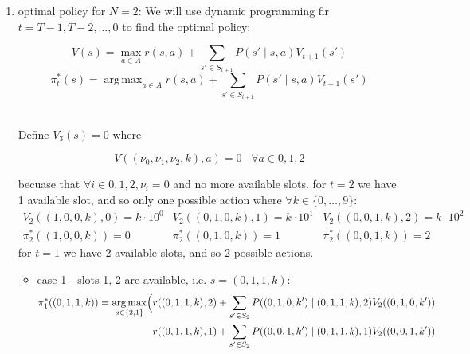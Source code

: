 \documentclass{assignmeownt}
\DeclareMathOperator*{\argmax}{arg\,max}
\begin{document}
\begin{enumerate}
\item optimal policy for $N=2$:
\newline
We will use dynamic programming fir $t=T-1, T-2, \dots, 0$ to find the optimal policy:
\begin{fleqn}
    \begin{equation}
        V(s) = \max_{a \in A}  r(s, a) + \sum_{s' \in S_{t+1}} P(s' \mid s, a) V_{t+1}(s')
    \end{equation}
    \begin{equation}
        \pi^*_t(s) = \argmax_{a \in A}  r(s, a) + \sum_{s' \in S_{t+1}} P(s' \mid s, a) V_{t+1}(s')
    \end{equation}
\end{fleqn}
\\ 
Define $V_3(s) = 0$ where 
\newline
\begin{fleqn}
    \begin{equation}
        V((\nu_0, \nu_1, \nu_2, k), a) = 0 \;\;\; \forall a \in {0, 1, 2}
    \end{equation}
\end{fleqn}
becuase that $\forall i \in {0, 1, 2}, \nu_i = 0$ and no more available slots.
\newline
for $t=2$ we have 1 available slot, and so only one possible action where $\forall k \in \{0, \dots, 9\}$:
\begin{equation}
    \begin{array}{ccc}
        V_2((1, 0, 0, k), 0) = k \cdot 10^0  & V_2((0, 1, 0, k), 1) = k \cdot 10^1 & V_2((0, 0, 1, k), 2) = k \cdot 10^2 \\
        \pi^*_2((1, 0, 0, k)) = 0 & \pi^*_2((0, 1, 0, k)) = 1 & \pi^*_2((0, 0, 1, k)) = 2
    \end{array}
\end{equation}
\newline
for $t=1$ we have 2 available slots, and so 2 possible actions.
\begin{itemize}
    \item{case 1 - slots 1, 2 are available, i.e. $s=(0, 1, 1, k)$:}
    \begin{equation}
        \begin{aligned}
            \pi^*_1((0, 1, 1, k)) = \argmax_{a \in \{2,1\}} \Bigl(
            &r((0, 1, 1, k), 2) + \sum_{s' \in S_2} P((0, 1, 0, k') \mid (0, 1, 1, k), 2) V_2((0, 1, 0, k')) , \\
            &r((0, 1, 1, k), 1) + \sum_{s' \in S_2} P((0, 0, 1, k') \mid (0, 1, 1, k), 1) V_2((0, 0, 1, k'))

\end{aligned}
\end{equation}
\end{itemize}
\end{enumerate}
\end{document}
